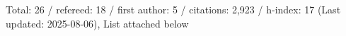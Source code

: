 Total: 26 / refereed: 18 / first author: 5 / citations: 2,923 / h-index: 17 (Last updated: 2025-08-06), List attached below